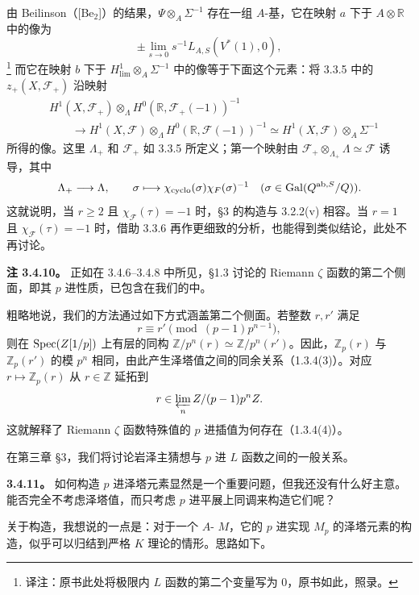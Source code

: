 由 Beilinson（[Be$_2$]）的结果，$\Psi\otimes_A\Sigma^{-1}$ 存在一组 $A$-基，它在映射 $a$ 下于 $A\otimes\mathbb R$ 中的像为
\[
 \pm\lim_{s\to0}s^{-1}L_{A,S}(V^*(1),0),
\]
\footnote{译注：原书此处将极限内 $L$ 函数的第二个变量写为 $0$，原书如此，照录。}
而它在映射 $b$ 下于 $H^1_{\mathrm{lim}}\otimes_A\Sigma^{-1}$ 中的像等于下面这个元素：将 3.3.5 中的 $z_+(X,\mathcal F_+)$ 沿映射
\begin{align*}
&H^1(X,\mathcal F_+)\otimes_\Lambda H^0(\mathbb R,\mathcal F_+(-1))^{-1}\\
&\qquad\longrightarrow H^1(X,\mathcal F)\otimes_\Lambda H^0(\mathbb R,\mathcal F(-1))^{-1}
 \simeq H^1(X,\mathcal F)\otimes_A\Sigma^{-1}
\end{align*}
所得的像。这里 $\Lambda_+$ 和 $\mathcal F_+$ 如 3.3.5 所定义；第一个映射由 $\mathcal F_+\otimes_{\Lambda_+}\Lambda\simeq\mathcal F$ 诱导，其中
\[
 \Lambda_+\longrightarrow\Lambda,\qquad
 \sigma\longmapsto\chi_{\mathrm{cyclo}}(\sigma)\chi_{\mathcal F}(\sigma)^{-1}
 \quad(\sigma\in\Gal(\mathbb Q^{\mathrm{ab},S}/\mathbb Q)).
\]
这就说明，当 $r\ge2$ 且 $\chi_{\mathcal F}(\tau)=-1$ 时，§3 的构造与 3.2.2(v) 相容。当 $r=1$ 且 $\chi_{\mathcal F}(\tau)=-1$ 时，借助 3.3.6 再作更细致的分析，也能得到类似结论，此处不再讨论。

\textbf{注 3.4.10。} 正如在 3.4.6--3.4.8 中所见，§1.3 讨论的 Riemann $\zeta$ 函数的第二个侧面，即其 $p$ 进性质，已包含在我们的中。

粗略地说，我们的方法通过如下方式涵盖第二个侧面。若整数 $r,r'$ 满足
\[
 r\equiv r'\pmod{(p-1)p^{n-1}},
\]
则在 $\Spec(\mathbb Z[1/p])$ 上有层的同构 $\mathbb Z/p^n(r)\simeq\mathbb Z/p^n(r')$。因此，$\mathbb Z_p(r)$ 与 $\mathbb Z_p(r')$ 的模 $p^n$ 相同，由此产生泽塔值之间的同余关系（1.3.4(3)）。对应 $r\mapsto\mathbb Z_p(r)$ 从 $r\in\mathbb Z$ 延拓到
\[
 r\in\varprojlim_n\mathbb Z/(p-1)p^n\mathbb Z.
\]
这就解释了 Riemann $\zeta$ 函数特殊值的 $p$ 进插值为何存在（1.3.4(4)）。

在第三章 §3，我们将讨论岩泽主猜想与 $p$ 进 $L$ 函数之间的一般关系。

\textbf{3.4.11。} 如何构造 $p$ 进泽塔元素显然是一个重要问题，但我还没有什么好主意。能否完全不考虑泽塔值，而只考虑 $p$ 进平展上同调来构造它们呢？

关于构造，我想说的一点是：对于一个 $A$- $M$，它的 $p$ 进实现 $M_p$ 的泽塔元素的构造，似乎可以归结到严格 $K$ 理论的情形。思路如下。

